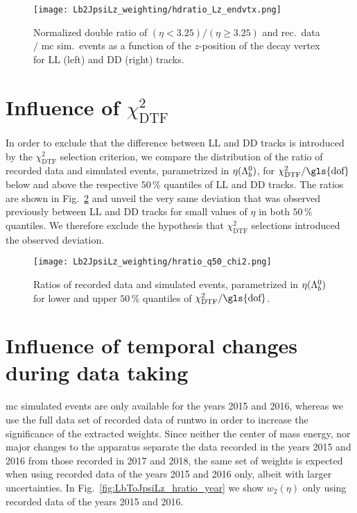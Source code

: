 \begin{figure}[htbp]
    \centering
    \texttt{[image: Lb2JpsiLz\_weighting/hdratio\_Lz\_endvtx.png]}
    \caption{Normalized double ratio of $(\eta < 3.25) / (\eta \ge 3.25)$ and rec.\ data $/$ \gls{mc} sim.\ events as a function of the $z$-position of the \Lz decay vertex for \gls{LL} (left) and \gls{DD} (right) tracks.}
    \label{fig:LbToJpsiLz_hdratio_Lz_endvtx}
\end{figure}

\section{Influence of $\chi^2_\text{DTF}$}
In order to exclude that the difference between \gls{LL} and \gls{DD} tracks is introduced by the $\chi^2_\text{DTF}$ selection criterion, we compare the distribution of the ratio of recorded data and simulated events, parametrized in $\eta({{\Lambda}^0_{b}})$, for $\chi^2_\text{DTF}/\text{\gls{dof}}$ below and above the respective $50\,\%$ quantiles of \gls{LL} and \gls{DD} tracks.
The ratios are shown in Fig.~\ref{fig:LbToJpsiLz/hratio_q50_chi2} and unveil the very same deviation that was observed previously between \gls{LL} and \gls{DD} tracks for small values of $\eta$ in both $50\,\%$ quantiles.
We therefore exclude the hypothesis that $\chi^2_\text{DTF}$ selections introduced the observed deviation.

\begin{figure}[htbp]
    \centering
    \texttt{[image: Lb2JpsiLz\_weighting/hratio\_q50\_chi2.png]}
    \caption{Ratios of recorded data and simulated events, parametrized in $\eta({{\Lambda}^0_{b}})$ for lower and upper $50\,\%$ quantiles of $\chi^2_\text{DTF}/\text{\gls{dof}}$.}
    \label{fig:LbToJpsiLz/hratio_q50_chi2}
\end{figure}

\section{Influence of temporal changes during data taking}
\gls{mc} simulated events are only available for the years 2015 and 2016, whereas we use the full data set of recorded data of \gls{runtwo} in order to increase the significance of the extracted weights.
Since neither the center of mass energy, nor major changes to the apparatus separate the data recorded in the years 2015 and 2016 from those recorded in 2017 and 2018, the same set of weights is expected when using recorded data of the years 2015 and 2016 only, albeit with larger uncertainties.
In Fig.~\ref{fig:LbToJpsiLz_hratio_year} we show $w_2(\eta)$ only using recorded data of the years 2015 and 2016.


